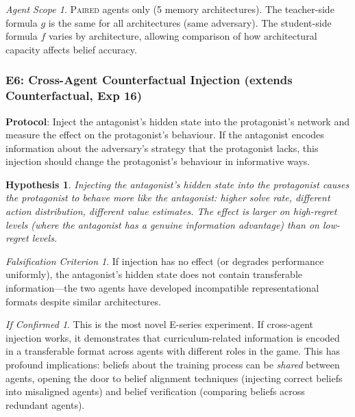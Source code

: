 \documentclass[11pt,a4paper]{article}
\newtheorem{hypothesis}{Hypothesis}[subsection]
\theoremstyle{remark}
\newtheorem*{falsification}{Falsification Criterion}
\newtheorem*{implication}{If Confirmed}
\newtheorem*{agentscope}{Agent Scope}
\newcommand{\paired}{\textsc{Paired}}
\begin{document}
\begin{agentscope}
\paired{} agents only (5 memory architectures). The teacher-side formula $g$ is the same for all architectures (same adversary). The student-side formula $f$ varies by architecture, allowing comparison of how architectural capacity affects belief accuracy.
\end{agentscope}

\subsubsection{E6: Cross-Agent Counterfactual Injection (extends Counterfactual, Exp 16)}
\label{exp:e6}

\textbf{Protocol}: Inject the antagonist's hidden state into the protagonist's network and measure the effect on the protagonist's behaviour. If the antagonist encodes information about the adversary's strategy that the protagonist lacks, this injection should change the protagonist's behaviour in informative ways.

\begin{hypothesis}
Injecting the antagonist's hidden state into the protagonist causes the protagonist to behave more like the antagonist: higher solve rate, different action distribution, different value estimates. The effect is larger on high-regret levels (where the antagonist has a genuine information advantage) than on low-regret levels.
\end{hypothesis}

\begin{falsification}
If injection has no effect (or degrades performance uniformly), the antagonist's hidden state does not contain transferable information---the two agents have developed incompatible representational formats despite similar architectures.
\end{falsification}

\begin{implication}
This is the most novel E-series experiment. If cross-agent injection works, it demonstrates that curriculum-related information is encoded in a transferable format across agents with different roles in the game. This has profound implications: beliefs about the training process can be \textit{shared} between agents, opening the door to belief alignment techniques (injecting correct beliefs into misaligned agents) and belief verification (comparing beliefs across redundant agents).
\end{implication}
\end{document}
